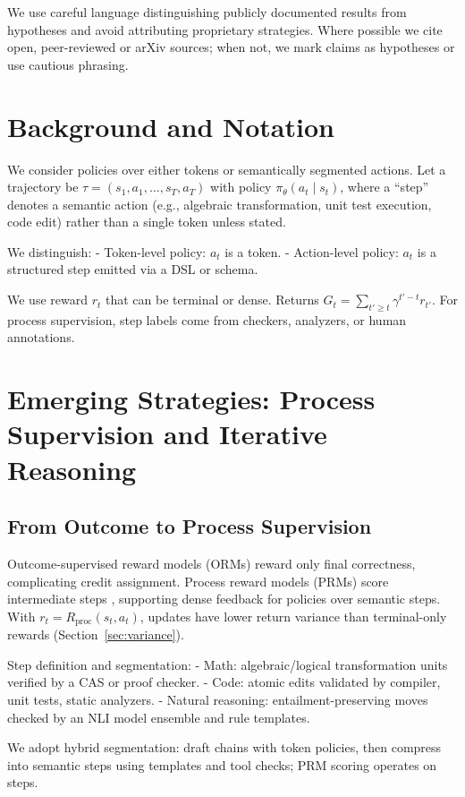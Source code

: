 \documentclass{article}
\begin{document}
We use careful language distinguishing publicly documented results from hypotheses and avoid attributing proprietary strategies. Where possible we cite open, peer-reviewed or arXiv sources; when not, we mark claims as hypotheses or use cautious phrasing.

\section{Background and Notation}
We consider policies over either tokens or semantically segmented actions. Let a trajectory be $\tau=(s_1,a_1,\ldots,s_T,a_T)$ with policy $\pi_\theta(a_t\mid s_t)$, where a ``step'' denotes a semantic action (e.g., algebraic transformation, unit test execution, code edit) rather than a single token unless stated.

We distinguish:
- Token-level policy: $a_t$ is a token.
- Action-level policy: $a_t$ is a structured step emitted via a DSL or schema.

We use reward $r_t$ that can be terminal or dense. Returns $G_t=\sum_{t' \ge t} \gamma^{t'-t} r_{t'}$. For process supervision, step labels come from checkers, analyzers, or human annotations.

\section{Emerging Strategies: Process Supervision and Iterative Reasoning}
\subsection{From Outcome to Process Supervision}
Outcome-supervised reward models (ORMs) reward only final correctness, complicating credit assignment. Process reward models (PRMs) score intermediate steps \cite{lightman2023lets}, supporting dense feedback for policies over semantic steps. With $r_t=R_{\mathrm{proc}}(s_t,a_t)$, updates have lower return variance than terminal-only rewards (Section~\ref{sec:variance}).

Step definition and segmentation:
- Math: algebraic/logical transformation units verified by a CAS or proof checker.
- Code: atomic edits validated by compiler, unit tests, static analyzers.
- Natural reasoning: entailment-preserving moves checked by an NLI model ensemble and rule templates.

We adopt hybrid segmentation: draft chains with token policies, then compress into semantic steps using templates and tool checks; PRM scoring operates on steps.
\end{document}
